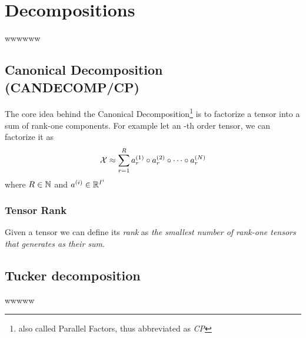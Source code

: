 \chapter{Decompositions}
wwwwww

\section{Canonical Decomposition (CANDECOMP/CP)}
The core idea behind the Canonical Decomposition\footnote{also called Parallel Factors, thus abbreviated as \emph{CP}} is to factorize a tensor into a sum of rank-one components. For example let \X an \N-th order tensor, we can factorize it as
\begin{equation}
  \mathcal{X} \approx \sum_{r = 1}^R a_r^{(1)} \circ a_r^{(2)} \circ \cdots \circ a_r^{(N)}
\end{equation}
where $R \in \mathbb{N}$ and $a^{(i)} \in \mathbb{R}^{I^i}$

\subsection{Tensor Rank}
Given a tensor \X we can define its \emph{rank} as \emph{the smallest number of rank-one tensors that generates \X as their sum}.

\section{Tucker decomposition}
wwwww

